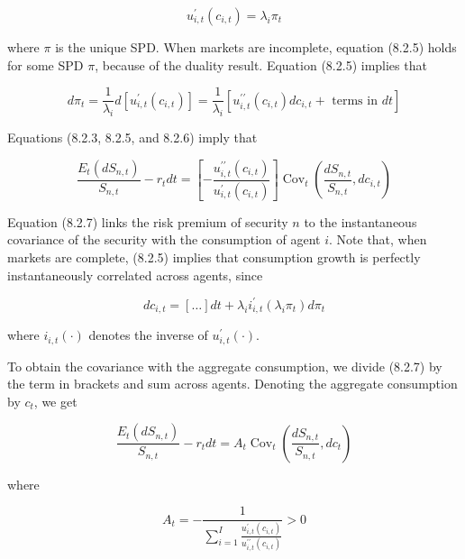 \documentclass[\topdir/lecture\_notes.tex]{subfiles}
\begin{document}
\begin{equation}
u_{i, t}^{\prime}\left(c_{i, t}\right)=\lambda_{i} \pi_{t} \label{eq:8.2.5}
\end{equation}

where \(\pi\) is the unique SPD. When markets are incomplete, equation (8.2.5) holds for some SPD \(\pi\), because of the duality result. Equation (8.2.5) implies that

\begin{equation}
d \pi_{t}=\frac{1}{\lambda_{i}} d\left[u_{i, t}^{\prime}\left(c_{i, t}\right)\right]=\frac{1}{\lambda_{i}}\left[u_{i, t}^{\prime \prime}\left(c_{i, t}\right) d c_{i, t}+\text { terms in } d t\right] \label{eq:8.2.6}
\end{equation}

Equations (8.2.3, 8.2.5, and 8.2.6) imply that

\begin{equation}
\frac{E_{t}\left(d S_{n, t}\right)}{S_{n, t}}-r_{t} d t=\left[-\frac{u_{i, t}^{\prime \prime}\left(c_{i, t}\right)}{u_{i, t}^{\prime}\left(c_{i, t}\right)}\right] \operatorname{Cov}_{t}\left(\frac{d S_{n, t}}{S_{n, t}}, d c_{i, t}\right) \label{eq:8.2.7}
\end{equation}

Equation (8.2.7) links the risk premium of security \(n\) to the instantaneous covariance of the security with the consumption of agent \(i\). Note that, when markets are complete, (8.2.5) implies that consumption growth is perfectly instantaneously correlated across agents, since

\begin{equation}
d c_{i, t}=[\ldots] d t+\lambda_{i} i_{i, t}^{\prime}\left(\lambda_{i} \pi_{t}\right) d \pi_{t}
\end{equation}

where \(i_{i, t}(\cdot)\) denotes the inverse of \(u_{i, t}^{\prime}(\cdot)\).

To obtain the covariance with the aggregate consumption, we divide (8.2.7) by the term in brackets and sum across agents. Denoting the aggregate consumption by \(c_{t}\), we get

\begin{equation}
\frac{E_{t}\left(d S_{n, t}\right)}{S_{n, t}}-r_{t} d t=A_{t} \operatorname{Cov}_{t}\left(\frac{d S_{n, t}}{S_{n, t}}, d c_{t}\right) \label{eq:8.2.8}
\end{equation}

where

\begin{equation}
A_{t}=-\frac{1}{\sum_{i=1}^{I} \frac{u_{i, t}^{\prime}\left(c_{i, t}\right)}{u_{i, t}^{\prime \prime}\left(c_{i, t}\right)}}>0
\end{equation}
\end{document}
